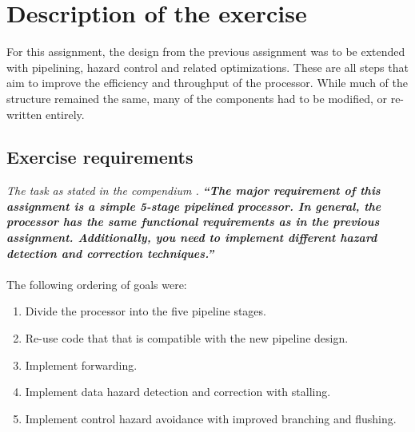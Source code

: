 \section{Description of the exercise}

For this assignment, the design from the previous assignment was to be extended
with pipelining, hazard control and related optimizations. These are all steps
that aim to improve the efficiency and throughput of the processor. While much
of the structure remained the same, many of the components had to be modified,
or re-written entirely.

\subsection{Exercise requirements}
\emph{The task as stated in the compendium \cite{compendium}.}\newline
\textbf{\emph{``The major requirement of this assignment is a simple 5-stage
pipelined processor. In general, the processor has the same functional
requirements as in the previous assignment. Additionally, you need to implement
different hazard detection and correction techniques.''}}
\paragraph*{}
The following ordering of goals were:
\begin{enumerate}
	\item Divide the processor into the five pipeline stages.
	\item Re-use code that that is compatible with the new pipeline design.
	\item Implement forwarding.
	\item Implement data hazard detection and correction with stalling.
	\item Implement control hazard avoidance with improved branching and
flushing.
\end{enumerate}
